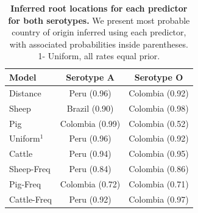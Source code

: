 \documentclass[10pt]{article}
\begin{document}
\begin{table}[!ht]
\caption{
\textbf{Inferred root locations for each predictor for both serotypes.} We present most probable country of origin inferred using each predictor, with associated probabilities inside parentheses. 1- Uniform, all rates equal prior.
}
\begin{center}
\begin{tabular}{lcc}
\toprule
Model & Serotype A & Serotype O \\
\midrule
Distance & Peru (0.96)& Colombia (0.92)\\
Sheep    & Brazil (0.90) & Colombia (0.98)\\
Pig      & Colombia (0.99) &Colombia (0.52)\\
Uniform$^1$  & Peru (0.96) &Colombia (0.92)\\
Cattle   & Peru (0.94) &Colombia (0.95)\\
Sheep-Freq & Peru (0.84)&Colombia (0.86)\\
Pig-Freq & Colombia (0.72) &Colombia (0.71)\\
Cattle-Freq & Peru (0.92)& Colombia (0.97)\\
 \bottomrule
\end{tabular}
\end{center}
\begin{flushleft}
\end{flushleft}
\label{tab:roots}
 \end{table}
\end{document}

